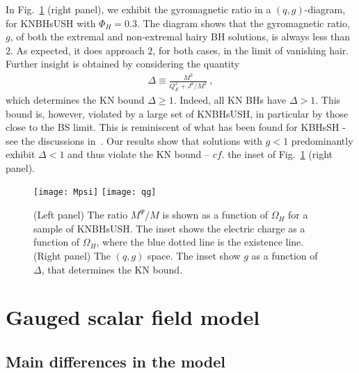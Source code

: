 In Fig.~\ref{fig:w-g} (right panel), we exhibit the gyromagnetic ratio in a $(q,g)$-diagram, for KNBHsUSH with $\Phi_H=0.3$.
The diagram shows that the gyromagnetic ratio, $g$, of both the extremal and non-extremal hairy BH solutions, is always less than $2$.
As expected, it does approach $2$, for both cases, in the limit of vanishing hair.
Further insight is obtained by considering the quantity
\begin{eqnarray}
\Delta\equiv \frac{M^2}{Q_E^2+J^2/M^2} \ ,
\end{eqnarray}
which determines the KN bound $\Delta\geqslant 1$. Indeed, all KN BHs have $\Delta>1$. This bound is, however, violated by a large set of KNBHsUSH, in particular by those close to the BS limit. This is reminiscent of what has been found for KBHsSH - see the discussions in~\cite{Herdeiro:2014goa,Herdeiro:2015gia,Herdeiro:2015tia,Delgado:2016zxv}.  Our results show that
solutions with $g<1$ predominantly exhibit $\Delta<1$ and thus violate the KN bound -- $cf.$ the inset of Fig.~\ref{fig:w-g} (right panel).



\begin{figure}[H]
  \begin{center}
    \texttt{[image: Mpsi]}
      \texttt{[image: qg]}
  \end{center}
  \caption{(Left panel) The ratio $M^\Psi/M$ is shown as a function of $\Omega_H$ for a sample of KNBHsUSH. The inset shows the electric charge as a function of $\Omega_H$, where the blue dotted line is the existence line. 
	(Right panel)  The $(q,g)$ space. The inset show $g$ as a function of $\Delta$, that determines the KN bound.
}
 \label{fig:w-g} 
\end{figure}

 
 


\section{Gauged scalar field model}
\label{sec_mod_g}




\subsection{Main differences in the model}

